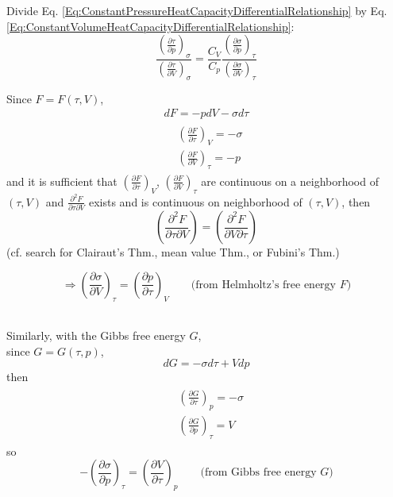 \documentclass[twoside,landscape,10pt]{amsart}
\theoremstyle{plain}
\theoremstyle{definition}
\theoremstyle{remark}
\theoremstyle{remark}
\begin{document}
\begin{multicols*}{2}
Divide Eq. \ref{Eq:ConstantPressureHeatCapacityDifferentialRelationship} by Eq. \ref{Eq:ConstantVolumeHeatCapacityDifferentialRelationship}:
\begin{equation}\label{Eq:ConstantPressureHeatCapacityRelationshipOverConstantVolume}
\frac{ \left( \frac{\partial \tau}{\partial p}\right)_{\sigma} }{ \left( \frac{\partial \tau}{\partial V}\right)_{\sigma} } = \frac{C_V}{C_p} \frac{ \left( \frac{\partial \sigma}{\partial p}\right)_{\tau} }{ \left( \frac{\partial \sigma}{\partial V}\right)_{\tau} }
\end{equation} 

Since $F= F(\tau, V)$, 
\[
\begin{gathered}
dF = -pdV - \sigma d\tau \\
\begin{aligned}
& \left(\frac{\partial F}{\partial \tau} \right)_V = -\sigma \\ 
& \left(\frac{\partial F}{\partial V} \right)_{\tau} = - p 
\end{aligned}
\end{gathered}
\]
and it is sufficient that $\left(\frac{\partial F}{\partial \tau} \right)_V$, $\left(\frac{\partial F}{\partial V} \right)_{\tau}$ are continuous on a neighborhood of $(\tau, V)$ and $\frac{\partial^2 F}{ \partial \tau \partial V}$ exists and is continuous on neighborhood of $(\tau, V)$, then
\[
\left(\frac{\partial^2 F}{\partial \tau \partial V} \right) = \left(\frac{\partial^2 F}{\partial V \partial \tau} \right)
\]
(cf. search for Clairaut's Thm., mean value Thm., or Fubini's Thm.)

\begin{equation}\label{Eq:2ndOrderPartialDerivativeHelmholtzRelationship}
\Longrightarrow \left( \frac{ \partial \sigma}{ \partial V} \right)_{\tau} = \left(\frac{\partial p}{\partial \tau } \right)_V \qquad \text{(from Helmholtz's free energy $F$)}
\end{equation}

\quad \\ 
Similarly, with the Gibbs free energy $G$, \\
since $G=G(\tau, p)$, 
\[
dG = -\sigma d\tau + Vdp
\]
then 
\[
\begin{gathered}
\begin{aligned}
& \left( \frac{\partial G}{\partial \tau} \right)_p = -\sigma \\ 
& \left( \frac{ \partial G}{\partial p} \right)_{\tau} = V
\end{aligned} 
\end{gathered}
\]
so 
\begin{equation}\label{Eq:2ndOrderPartialDerivativeGibbsRelationship}
-\left( \frac{ \partial \sigma}{ \partial p} \right)_{\tau} = \left(\frac{\partial V}{\partial \tau } \right)_p \qquad \text{(from Gibbs free energy $G$)}
\end{equation}


\end{multicols*}
\end{document}
